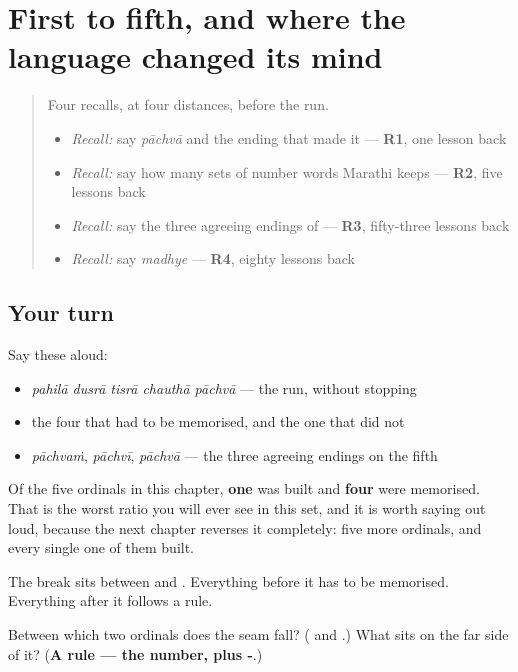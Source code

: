 \section[\texorpdfstring{\mr{पहिला} · \mr{दुसरा} … (pahilā · dusrā …)}{पहिला · दुसरा … (pahilā · dusrā …)}]{First to fifth, and where the language changed its mind}

\label{lesson:MR-R60-first-to-fifth}



\begin{quote}
Four recalls, at four distances, before the run.

\begin{itemize}
\raggedright
  \item \emph{Recall:} say \emph{pāchvā} and the ending that made it — \textbf{R1}, one lesson back
  \item \emph{Recall:} say how many sets of number words Marathi keeps — \textbf{R2}, five lessons back
  \item \emph{Recall:} say the three agreeing endings of \textbf{} — \textbf{R3}, fifty-three lessons back
  \item \emph{Recall:} say \emph{madhye} — \textbf{R4}, eighty lessons back
\end{itemize}
\end{quote}

\subsection*{Your turn}
Say these aloud:

\begin{itemize}
\raggedright
  \item \emph{pahilā dusrā tisrā chauthā pāchvā} — the run, without stopping
  \item the four that had to be memorised, and the one that did not
  \item \emph{pāchvaṁ}, \emph{pāchvī}, \emph{pāchvā} — the three agreeing endings on the fifth
\end{itemize}

\begin{grammarlens}[title={What you've built this chapter, in one number}]
Of the five ordinals in this chapter, \textbf{one} was built and \textbf{four} were memorised. That is the worst ratio you will ever see in this set, and it is worth saying out loud, because the next chapter reverses it completely: five more ordinals, and every single one of them built.

The break sits between \textbf{} and \textbf{}. Everything before it has to be memorised. Everything after it follows a rule.
\end{grammarlens}

\begin{tcolorbox}[breakable,colback=teal!4,colframe=teal!35!black,title={Before you move on}]
Between which two ordinals does the seam fall? (\textbf{} and \textbf{}.) What sits on the far side of it? (\textbf{A rule — the number, plus -}.)
\end{tcolorbox}
